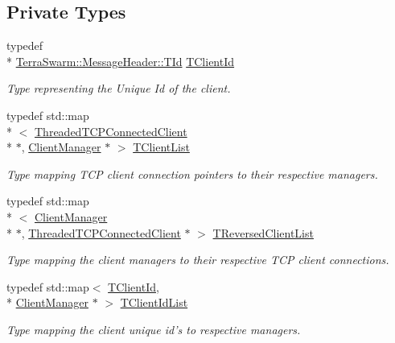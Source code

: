 \subsection*{Private Types}
\begin{DoxyCompactItemize}
\item 
typedef \\*
\hyperlink{class_terra_swarm_1_1_message_header_ab55de822fadad758edcd8f36bd07676e}{Terra\-Swarm\-::\-Message\-Header\-::\-T\-Id} \hyperlink{class_connection_manager_a0c3634c02b95af84a477b253fcf2b29a}{T\-Client\-Id}
\begin{DoxyCompactList}\small\item\em Type representing the Unique Id of the client. \end{DoxyCompactList}\item 
typedef std\-::map\\*
$<$ \hyperlink{class_threaded_t_c_p_connected_client}{Threaded\-T\-C\-P\-Connected\-Client} \\*
$\ast$, \hyperlink{class_client_manager}{Client\-Manager} $\ast$ $>$ \hyperlink{class_connection_manager_a7b6865543285e3b27b981a739fd0db18}{T\-Client\-List}
\begin{DoxyCompactList}\small\item\em Type mapping T\-C\-P client connection pointers to their respective managers. \end{DoxyCompactList}\item 
typedef std\-::map\\*
$<$ \hyperlink{class_client_manager}{Client\-Manager} \\*
$\ast$, \hyperlink{class_threaded_t_c_p_connected_client}{Threaded\-T\-C\-P\-Connected\-Client} $\ast$ $>$ \hyperlink{class_connection_manager_aa35cf836145608197dbe4201b115991c}{T\-Reversed\-Client\-List}
\begin{DoxyCompactList}\small\item\em Type mapping the client managers to their respective T\-C\-P client connections. \end{DoxyCompactList}\item 
typedef std\-::map$<$ \hyperlink{class_connection_manager_a0c3634c02b95af84a477b253fcf2b29a}{T\-Client\-Id}, \\*
\hyperlink{class_client_manager}{Client\-Manager} $\ast$ $>$ \hyperlink{class_connection_manager_a78c371deff0ac4add801b3c64216a467}{T\-Client\-Id\-List}
\begin{DoxyCompactList}\small\item\em Type mapping the client unique id's to respective managers. \end{DoxyCompactList}\end{DoxyCompactItemize}
